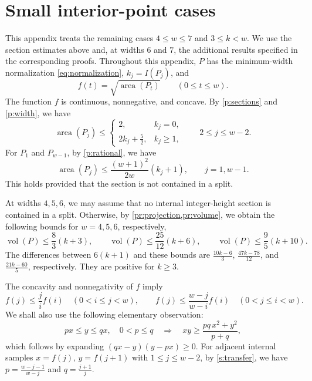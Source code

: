 \documentclass[reqno, 11pt]{article}
\numberwithin{equation}{section}
\theoremstyle{definition}
\DeclareMathOperator{\vol}{vol}
\DeclareMathOperator{\area}{area}
\numberwithin{equation}{section}
\begin{document}
\section{Small interior-point cases}\label{s:section}

This appendix treats the remaining cases $4\le w\le7$ and $3\le k<w$. We use the section estimates above and, at widths $6$ and $7$, the additional results specified in the corresponding proofs.
Throughout this appendix, $P$ has the minimum-width normalization \eqref{eq:normalization}, $k_j=I(P_j)$, and
\[
 f(t)=\sqrt{\area(P_t)}\qquad(0\le t\le w).
\]
The function $f$ is continuous, nonnegative, and concave. By \cref{p:sections} and \cref{p:width}, we have
\begin{equation}\label{s:middle}
 \area(P_j)\le
 \begin{cases}
 2,&k_j=0,\\
 2k_j+\frac{5}{2},&k_j\ge1,
 \end{cases}
 \qquad 2\le j\le w-2.
\end{equation}
For $P_1$ and $P_{w-1}$, by \cref{p:rational}, we have 
\begin{equation}\label{s:outer}
 \area(P_j)\le\frac{(w+1)^2}{2w}(k_j+1),\qquad j=1,w-1.
\end{equation}
This holds provided that the section is not contained in a split.

At widths $4,5,6$, we may assume that no internal integer-height section is contained in a split. 
Otherwise, by \cref{pr:projection,pr:volume}, we obtain the following bounds for $w=4,5,6$, respectively,
\begin{equation}\label{s:split}
 \vol(P)\le\frac83(k+3),\qquad
 \vol(P)\le\frac{25}{12}(k+6),\qquad
 \vol(P)\le\frac95(k+10).
\end{equation}
The differences between $6(k+1)$ and these bounds are $\frac{10k-6}{3}$, $\frac{47k-78}{12}$, and $\frac{21k-60}{5}$, respectively.
They are positive for $k\ge3$.

The concavity and nonnegativity of $f$ imply
\begin{equation}\label{s:transfer}
 f(j)\le\frac{j}{i}f(i)\quad (0<i\le j<w),\qquad
 f(j)\le\frac{w-j}{w-i}f(i)\quad (0<j\le i<w).
\end{equation}
We shall also use the following elementary observation:
\begin{equation}\label{s:linear-product}
 px\le y\le qx,\quad 0<p\le q
 \quad\Longrightarrow\quad
 xy\ge\frac{pq\,x^2+y^2}{p+q},
\end{equation}
which follows by expanding $(qx-y)(y-px)\ge0$.
For adjacent internal samples $x=f(j)$, $y=f(j+1)$ with $1\le j\le w-2$, by \eqref{s:transfer}, we have 
$p=\frac{w-j-1}{w-j}$ and $q=\frac{j+1}{j}$.
\end{document}
